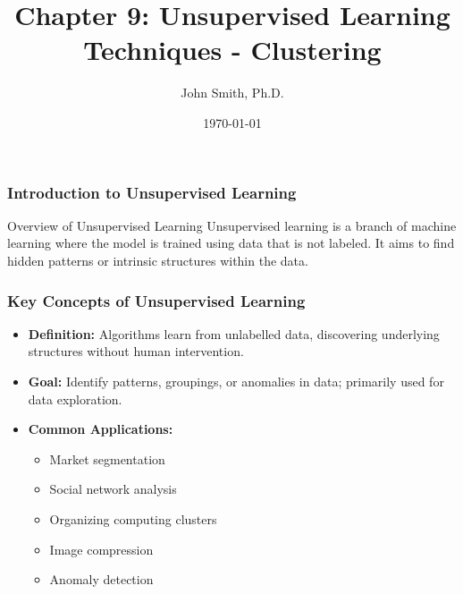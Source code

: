 \documentclass[aspectratio=169]{beamer}
\title[Chapter 9: Unsupervised Learning Techniques - Clustering]{Chapter 9: Unsupervised Learning Techniques - Clustering}
\author[J. Smith]{John Smith, Ph.D.}
\date{\today}
\begin{document}
\frame{\titlepage}

\begin{frame}[fragile]
    \frametitle{Introduction to Unsupervised Learning}
    \begin{block}{Overview of Unsupervised Learning}
        Unsupervised learning is a branch of machine learning where the model is trained using data that is not labeled. 
        It aims to find hidden patterns or intrinsic structures within the data.
    \end{block}
\end{frame}

\begin{frame}[fragile]
    \frametitle{Key Concepts of Unsupervised Learning}
    \begin{itemize}
        \item \textbf{Definition:} Algorithms learn from unlabelled data, discovering underlying structures without human intervention.
        \item \textbf{Goal:} Identify patterns, groupings, or anomalies in data; primarily used for data exploration.
        \item \textbf{Common Applications:} 
        \begin{itemize}
            \item Market segmentation
            \item Social network analysis
            \item Organizing computing clusters
            \item Image compression
            \item Anomaly detection
        \end{itemize}
    \end{itemize}
\end{frame}
\end{document}

